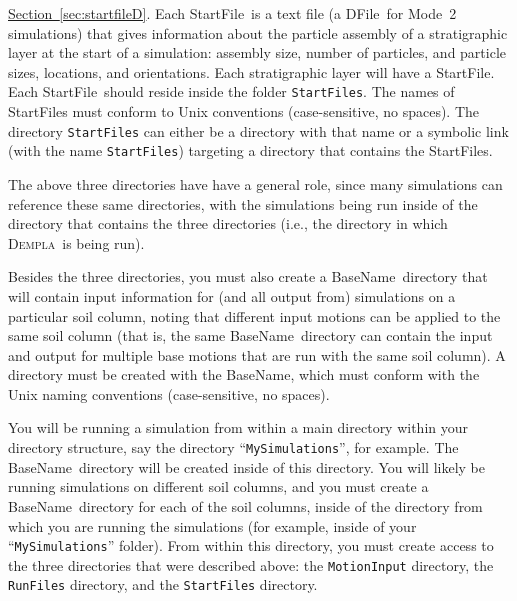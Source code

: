 \documentclass[letterpaper,11pt]{article}
\newcommand{\Dempla}{\textsc{Dempla}}
\newcommand{\StartFile}{\textsf{StartFile}}
\newcommand{\BaseName}{\textsf{BaseName}}
\newcommand{\DFile}{\textsf{DFile}}
\begin{document}
\begin{itemize}
        \hyperref[sec:startfileD]{Section~\ref*{sec:startfileD}}.
        Each \StartFile\ is a text file (a \DFile\ for
        Mode~2 simulations) that
        gives information about the particle assembly
        of a stratigraphic layer
        at the start of a simulation:
        assembly size, number of particles, and
        particle sizes, locations, and orientations.
        Each stratigraphic layer will have a \StartFile.
        Each \StartFile\ should reside inside the
        folder \texttt{StartFiles}.
        The names of \StartFile s must conform
        to Unix conventions
        (case-sensitive, no spaces).
        The directory \texttt{StartFiles} can either
        be a directory with that name or a symbolic link
        (with the name \texttt{StartFiles}) targeting
        a directory that contains the \StartFile s.
    \end{itemize}
%
    The above three directories have have a general role,
    since many simulations can reference these same directories,
    with the simulations
    being run inside of the directory that contains
    the three directories
    (i.e., the directory in which \Dempla\ is being run).
    \par
    Besides the three directories, you must also create
    a \BaseName\ directory
    that will contain input information for (and all output
    from) simulations on a particular soil column,
    noting that
    different input motions can be applied to the same
    soil column (that is, the same \BaseName\ directory
    can contain the input and output for
    multiple base motions that are run with the
    same soil column).
    A directory must be created with the \BaseName,
    which must conform with the Unix naming conventions
    (case-sensitive, no spaces).
    \par
    You will be running a simulation from within a main
    directory within your directory structure, say the directory
    ``\texttt{MySimulations}'', for example.
    The \BaseName\ directory will be created inside of
    this directory.
    You will likely be running simulations on different soil
    columns, and you must create a \BaseName\ directory
    for each of the soil columns, inside of the directory
    from which you are running the simulations
    (for example, inside of your ``\texttt{MySimulations}'' folder).
    From within this directory, you must create access to the
    three directories that were described above:
    the \texttt{MotionInput} directory, the \texttt{RunFiles}
    directory, and the \texttt{StartFiles} directory.
\end{document}
